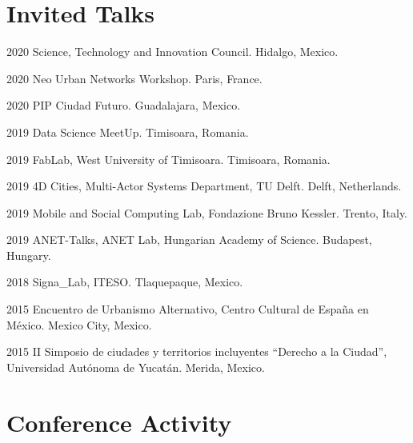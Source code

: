 \documentclass{academiccv}
\begin{document}
\section*{Invited Talks}
\begin{tablist}
	\item[2020] \tab Science, Technology and Innovation Council. Hidalgo, Mexico.
	\item[2020] \tab Neo Urban Networks Workshop. Paris, France.
	\item[2020] \tab PIP Ciudad Futuro. Guadalajara, Mexico.
	\item[2019] \tab Data Science MeetUp. Timisoara, Romania.
	\item[2019] \tab FabLab, West University of Timisoara. Timisoara, Romania.
	\item[2019] \tab 4D Cities, Multi-Actor Systems Department, TU Delft. Delft, Netherlands.
	\item[2019] \tab Mobile and Social Computing Lab, Fondazione Bruno Kessler. Trento, Italy.
	\item[2019] \tab ANET-Talks, ANET Lab, Hungarian Academy of Science. Budapest, Hungary.
	\item[2018] \tab Signa\_Lab, ITESO. Tlaquepaque, Mexico.
	\item[2015] \tab Encuentro de Urbanismo Alternativo, Centro Cultural de España en México. Mexico City, Mexico.
	\item[2015] \tab II Simposio de ciudades y territorios incluyentes \enquote{Derecho a la Ciudad}, Universidad Autónoma de Yucatán. Merida, Mexico.
\end{tablist}

\section*{Conference Activity}

\end{document}
